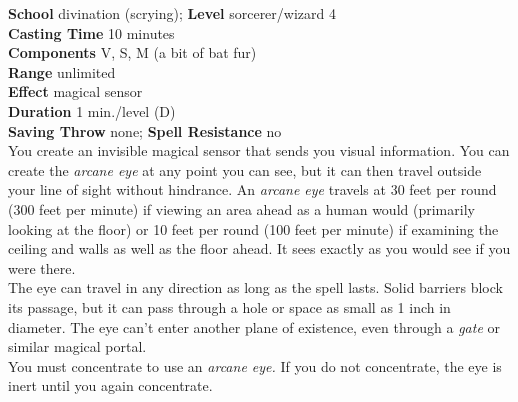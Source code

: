 \textbf{School} divination (scrying); \textbf{Level} sorcerer/wizard 4\\
\textbf{Casting Time} 10 minutes\\
\textbf{Components} V, S, M (a bit of bat fur)\\
\textbf{Range} unlimited\\
\textbf{Effect }magical sensor\\
\textbf{Duration} 1 min./level (D)\\
\textbf{Saving Throw} none; \textbf{Spell Resistance} no\\
You create an invisible magical sensor that sends you visual information. You can create the \textit{arcane eye }at any point you can see, but it can then travel outside your line of sight without hindrance. An \textit{arcane eye }travels at 30 feet per round (300 feet per minute) if viewing an area ahead as a human would (primarily looking at the floor) or 10 feet per round (100 feet per minute) if examining the ceiling and walls as well as the floor ahead. It sees exactly as you would see if you were there.\\
The eye can travel in any direction as long as the spell lasts. Solid barriers block its passage, but it can pass through a hole or space as small as 1 inch in diameter. The eye can't enter another plane of existence, even through a \textit{gate }or similar magical portal.\\
You must concentrate to use an \textit{arcane eye. }If you do not concentrate, the eye is inert until you again concentrate.\\
